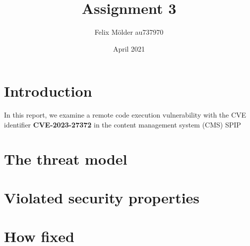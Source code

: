 \documentclass[12pt]{article}
\title{Assignment 3}
\author{Felix Mölder au737970}
\date{April 2021}
\begin{document}
\maketitle

\begin{multicols}{2}

\section{Introduction}
In this report, we examine a remote code execution vulnerability with the CVE identifier \textbf{CVE-2023-27372} in the content management system (CMS) SPIP \cite{SPIP}
\section{The threat model}

\section{Violated security properties}

\section{How fixed}




\end{multicols}
\end{document}
